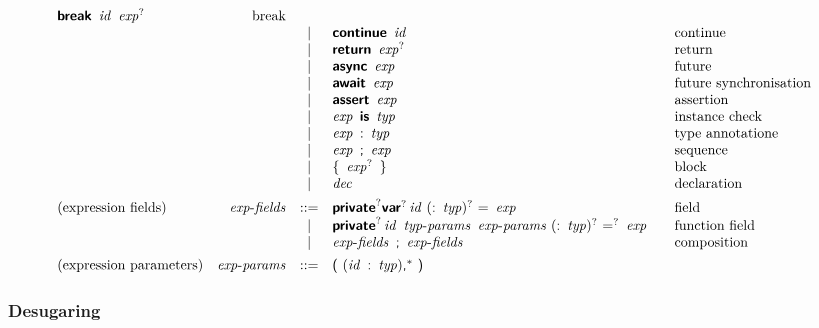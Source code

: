 $$\begin{array}{@{}lrcl@{\qquad}l}
  \KK{break}~\x{id}~\x{exp}^?
    & \text{break} \\&&|&
  \KK{continue}~\x{id}
    & \text{continue} \\&&|&
  \KK{return}~\x{exp}^?
    & \text{return} \\&&|&
  \KK{async}~\x{exp}
    & \text{future} \\&&|&
  \KK{await}~\x{exp}
    & \text{future synchronisation} \\&&|&
  \KK{assert}~\x{exp}
    & \text{assertion} \\&&|&
  \x{exp}~\KK{is}~\x{typ}
    & \text{instance check} \\&&|&
  \x{exp}~\K:~\x{typ}
    & \text{type annotatione} \\&&|&
  \x{exp}~\K;~\x{exp}
    & \text{sequence} \\&&|&
  \K\{~\x{exp}^?~\K\}
    & \text{block} \\&&|&
  \x{dec}
    & \text{declaration} \\
[1ex]
\text{(expression fields)} & \x{exp-fields} &::=&
  \KK{private}^? \KK{var}^? \x{id}~(\K:~\x{typ})^?~\K=~\x{exp}
    & \text{field} \\&&|&
  \KK{private}^? \x{id}~\x{typ-params}~\x{exp-params}~(\K:~\x{typ})^?~\K=^?~\x{exp}
    & \text{function field} \\&&|&
  \x{exp-fields}~\K;~\x{exp-fields}
    & \text{composition} \\
[1ex]
\text{(expression parameters)} & \x{exp-params} &::=&
  \K(~(\x{id}~\K:~\x{typ})\K,^\ast~\K) \\
\end{array}
$$

\subsubsection*{Desugaring}

